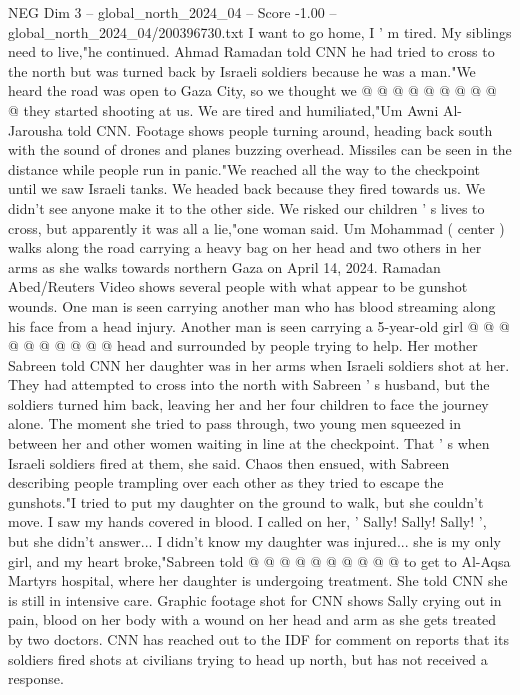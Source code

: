 \begin{textsample}{NEG Dim 3 – global\_north\_2024\_04 – Score -1.00 – global\_north\_2024\_04/200396730.txt}
I want to go home, I ' m tired.
My siblings need to live,"he continued.
Ahmad Ramadan told CNN he had tried to cross to the north but was turned back by Israeli soldiers because he was a man."We heard the road was open to Gaza City, so we thought we @ @ @ @ @ @ @ @ @ @ they started shooting at us.
We are tired and humiliated,"Um Awni Al-Jarousha told CNN.
Footage shows people turning around, heading back south with the sound of drones and planes buzzing overhead.
Missiles can be seen in the distance while people run in panic."We reached all the way to the checkpoint until we saw Israeli tanks.
We headed back because they fired towards us.
We didn't see anyone make it to the other side.
We risked our children ' s lives to cross, but apparently it was all a lie,"one woman said.
Um Mohammad ( center ) walks along the road carrying a heavy bag on her head and two others in her arms as she walks towards northern Gaza on April 14, 2024.
Ramadan Abed/Reuters Video shows several people with what appear to be gunshot wounds.
One man is seen carrying another man who has blood streaming along his face from a head injury.
Another man is seen carrying a 5-year-old girl @ @ @ @ @ @ @ @ @ @ head and surrounded by people trying to help.
Her mother Sabreen told CNN her daughter was in her arms when Israeli soldiers shot at her.
They had attempted to cross into the north with Sabreen ' s husband, but the soldiers turned him back, leaving her and her four children to face the journey alone.
The moment she tried to pass through, two young men squeezed in between her and other women waiting in line at the checkpoint.
That ' s when Israeli soldiers fired at them, she said.
Chaos then ensued, with Sabreen describing people trampling over each other as they tried to escape the gunshots."I tried to put my daughter on the ground to walk, but she couldn't move.
I saw my hands covered in blood.
I called on her, ' Sally!
Sally!
Sally! ', but she didn't answer...
I didn't know my daughter was injured... she is my only girl, and my heart broke,"Sabreen told @ @ @ @ @ @ @ @ @ @ to get to Al-Aqsa Martyrs hospital, where her daughter is undergoing treatment.
She told CNN she is still in intensive care.
Graphic footage shot for CNN shows Sally crying out in pain, blood on her body with a wound on her head and arm as she gets treated by two doctors.
CNN has reached out to the IDF for comment on reports that its soldiers fired shots at civilians trying to head up north, but has not received a response.

\end{textsample}
